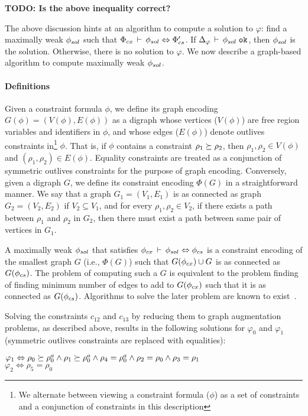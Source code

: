 \textbf{TODO: Is the above inequality correct?}

The above discussion hints at an algorithm to compute a solution to
$\varphi$: find a maximally weak $\phi_{sol}$ such that $\Phi_{cx}\,\vdash\,\phi_{sol} \Leftrightarrow \Phi_{cs}'$. If $\Delta_{\varphi}\,\vdash\,\phi_{sol} \; \texttt{ok}$, then $\phi_{sol}$ is the solution. Otherwise, there is no
solution to $\varphi$. We now describe a graph-based algorithm to
compute maximally weak $\phi_{sol}$.

\paragraph{Definitions} Given a constraint formula $\phi$, we define
its graph encoding $G(\phi)=(V(\phi),E(\phi))$ as a digraph whose
vertices ($V(\phi)$) are free region variables and identifiers in
$\phi$, and whose edges ($E(\phi)$) denote outlives constraints
in\footnote{We alternate between viewing a constraint formula ($\phi$)
as a set of constraints and a conjunction of constraints in this
description} $\phi$.  That is, if $\phi$ contains a constraint $\rho_1
\succeq \rho_2$, then $\rho_1,\rho_2 \in V(\phi)$ and
$(\rho_1,\rho_2) \in E(\phi)$. Equality constraints are treated as a
conjunction of symmetric outlives constraints for the purpose of graph
encoding. Conversely, given a digraph $G$, we define its constraint
encoding $\Phi(G)$ in a straightforward manner. We say that a graph
$G_1=(V_1,E_1)$ is as connected as graph $G_2=(V_2,E_2)$ if $V_2
\subseteq V_1$, and for every $\rho_1, \rho_2 \in V_2$, if there
exists a path between $\rho_1$ and $\rho_2$ in $G_2$, then there must
exist a path between same pair of vertices in $G_1$. 

A maximally weak $\phi_{sol}$ that satisfies $\phi_{cx}\,\vdash\,\phi_{sol}
\Leftrightarrow \phi_{cs}$ is a constraint encoding of the smallest
graph $G$ (i.e., $\Phi(G)$) such that $G(\phi_{cx}) \cup G$ is as
connected as $G(\phi_{cs})$. The problem of computing such a $G$ is
equivalent to the problem finding of finding minimum number of edges
to add to $G(\phi_{cx})$ such that it is as connected as $G(\phi_{cs})$.
Algorithms to solve the later problem are known to
exist~\cite{siam92}.

Solving the constraints $c_{12}$ and $c_{13}$ by reducing them to
graph augmentation problems, as described above, results in the
following solutions for $\varphi_0$ and $\varphi_1$ (symmetric
outlives constraints are replaced with equalities):
\begin{center}
\(
  \varphi_1 \Leftrightarrow \rho_0 \succeq \rho^a_0 \wedge \rho_1
     \succeq \rho^a_0 \wedge \rho_4 = \rho^a_0 \wedge 
     \rho_2 = \rho_0 \wedge \rho_3 = \rho_1
\)\\
\(
  \varphi_2 \Leftrightarrow \rho_5 = \rho_0
\)
\end{center}


